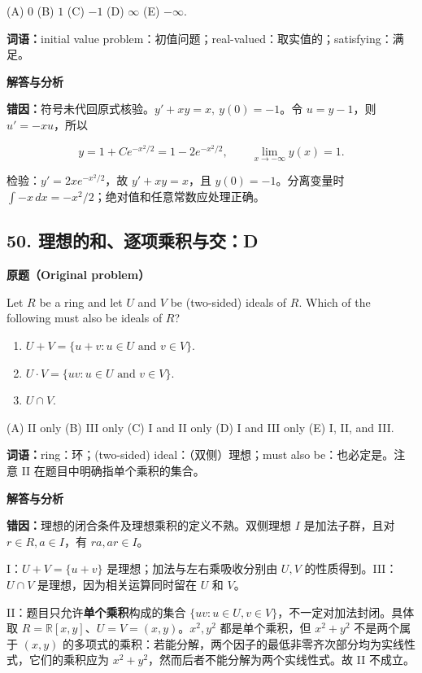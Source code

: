 \documentclass[11pt,a4paper]{ctexart}
\begin{document}
(A) $0$ \quad (B) $1$ \quad (C) $-1$ \quad (D) $\infty$ \quad (E) $-\infty$.

\textbf{词语：}initial value problem：初值问题；real-valued：取实值的；satisfying：满足。

\textbf{解答与分析}\par


\textbf{错因：}符号未代回原式核验。\(y'+xy=x,\ y(0)=-1\)。令
\(u=y-1\)，则 \(u'=-xu\)，所以

\[y=1+Ce^{-x^2/2}=1-2e^{-x^2/2},\qquad \lim_{x\to-\infty}y(x)=1.\]

检验：\(y'=2xe^{-x^2/2}\)，故 \(y'+xy=x\)，且 \(y(0)=-1\)。分离变量时
\(\int -x\,dx=-x^2/2\)；绝对值和任意常数应处理正确。

\hypertarget{ux7406ux60f3ux7684ux548cux9010ux9879ux4e58ux79efux4e0eux4ea4d}{%
\subsection{50.
理想的和、逐项乘积与交：D}\label{ux7406ux60f3ux7684ux548cux9010ux9879ux4e58ux79efux4e0eux4ea4d}}

\textbf{原题（Original problem）}\par
Let $R$ be a ring and let $U$ and $V$ be (two-sided) ideals of $R$. Which of the following must also be ideals of $R$?
\begin{enumerate}[label=\Roman*.]
\item $U+V=\{u+v:u\in U\text{ and }v\in V\}$.
\item $U\cdot V=\{uv:u\in U\text{ and }v\in V\}$.
\item $U\cap V$.
\end{enumerate}
(A) II only \quad (B) III only \quad (C) I and II only \quad (D) I and III only \quad (E) I, II, and III.

\textbf{词语：}ring：环；(two-sided) ideal：（双侧）理想；must also be：也必定是。注意 II 在题目中明确指单个乘积的集合。

\textbf{解答与分析}\par


\textbf{错因：}理想的闭合条件及理想乘积的定义不熟。双侧理想 \(I\)
是加法子群，且对 \(r\in R,a\in I\)，有 \(ra,ar\in I\)。

I：\(U+V=\{u+v\}\) 是理想；加法与左右乘吸收分别由 \(U,V\)
的性质得到。III：\(U\cap V\) 是理想，因为相关运算同时留在 \(U\) 和
\(V\)。

II：题目只允许\textbf{单个乘积}构成的集合
\(\{uv:u\in U,v\in V\}\)，不一定对加法封闭。具体取
\(R=\mathbb R[x,y]\)、\(U=V=(x,y)\)。\(x^2,y^2\) 都是单个乘积，但
\(x^2+y^2\) 不是两个属于 \((x,y)\)
的多项式的乘积：若能分解，两个因子的最低非零齐次部分均为实线性式，它们的乘积应为
\(x^2+y^2\)，然而后者不能分解为两个实线性式。故 II 不成立。
\end{document}
